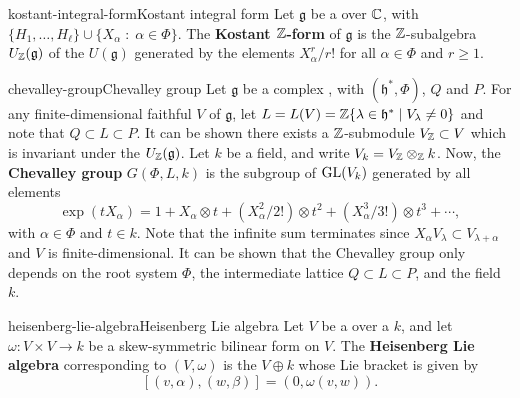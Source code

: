 \begin{topic}{kostant-integral-form}{Kostant integral form}
    Let $\mathfrak{g}$ be a   over $\mathbb{C}$, with  $\{ H_1, \ldots, H_\ell \} \cup \{ X_\alpha \;:\; \alpha \in \Phi \}$. The \textbf{Kostant $\mathbb{Z}$-form} of $\mathfrak{g}$ is the $\mathbb{Z}$-subalgebra $U_{\mathbb{Z}}(\mathfrak{g})$ of the  $U(\mathfrak{g})$ generated by the elements $X_\alpha^r / r!$ for all $\alpha \in \Phi$ and $r \ge 1$.
\end{topic}

\begin{topic}{chevalley-group}{Chevalley group}
    Let $\mathfrak{g}$ be a  complex , with  $(\mathfrak{h}^*, \Phi)$,  $Q$ and  $P$. For any finite-dimensional faithful  $V$ of $\mathfrak{g}$, let $L = L(V) = \mathbb{Z} \{ \lambda \in \mathfrak{h}^* \mid V_\lambda \ne 0 \}$ and note that $Q \subset L \subset P$. It can be shown there exists a $\mathbb{Z}$-submodule $V_{\mathbb{Z}} \subset V$ which is invariant under the  $U_{\mathbb{Z}}(\mathfrak{g})$. Let $k$ be a field, and write $V_k = V_{\mathbb{Z}} \otimes_{\mathbb{Z}} k$. Now, the \textbf{Chevalley group} $G(\Phi, L, k)$ is the subgroup of $\textup{GL}(V_k)$ generated by all elements
    \[ \exp(t X_\alpha) = 1 + X_\alpha \otimes t + (X_\alpha^2 / 2!) \otimes t^2 + (X_\alpha^3 / 3!) \otimes t^3 + \cdots , \]
    with $\alpha \in \Phi$ and $t \in k$. Note that the infinite sum terminates since $X_\alpha V_\lambda \subset V_{\lambda + \alpha}$ and $V$ is finite-dimensional. It can be shown that the Chevalley group only depends on the root system $\Phi$, the intermediate lattice $Q \subset L \subset P$, and the field $k$.
\end{topic}



\begin{topic}{heisenberg-lie-algebra}{Heisenberg Lie algebra}
    Let $V$ be a  over a  $k$, and let $\omega : V \times V \to k$ be a skew-symmetric bilinear form on $V$. The \textbf{Heisenberg Lie algebra} corresponding to $(V, \omega)$ is the  $V \oplus k$ whose Lie bracket is given by
    \[ [ (v, \alpha), (w, \beta) ] = (0, \omega(v, w)) . \]
\end{topic}
